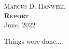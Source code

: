 \documentclass[11pt]{article}
\begin{document}
\thispagestyle{plain}
\begin{center}

\textsc{Marcus D. Hanwell}\\[2.25 cm]

\textsc{\LARGE \bfseries Report}\\[2.1cm]

June, 2022\\[2.25cm]
\end{center}

Things were done...
\end{document}
